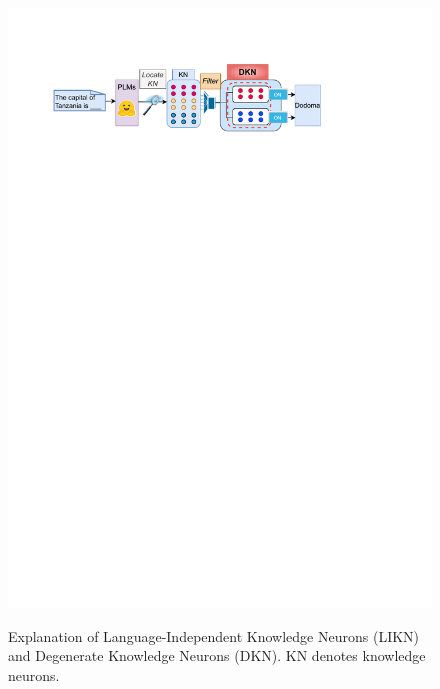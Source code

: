 \documentclass[]{article}
\begin{document}
\begin{figure}
{\includegraphics[width=0.95\linewidth]{figures/intro2.drawio.pdf}
\label{fig:intro2}
}
\caption{Explanation of Language-Independent Knowledge Neurons (LIKN) and Degenerate Knowledge Neurons (DKN). KN denotes knowledge neurons.}
\label{fig-intro}
\end{figure}
\end{document}
